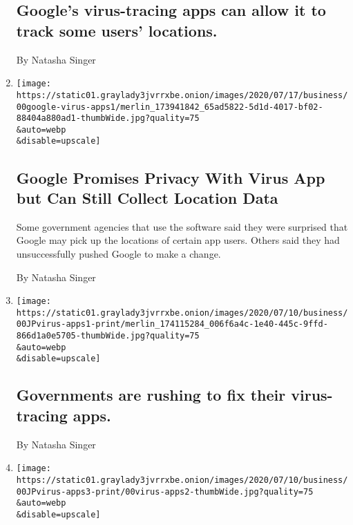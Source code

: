 \begin{enumerate}
{  \subsection{Google's virus-tracing apps can allow it to track some
  users'
  locations.}\label{googles-virus-tracing-apps-can-allow-it-to-track-some-users-locations-1}}

  By Natasha Singer
\item
  \href{/2020/07/20/technology/google-covid-tracker-app.html}{}

  \texttt{[image: https://static01.graylady3jvrrxbe.onion/images/2020/07/17/business/00google-virus-apps1/merlin\_173941842\_65ad5822-5d1d-4017-bf02-88404a880ad1-thumbWide.jpg?quality=75\\\&auto=webp\\\&disable=upscale]}

  \hypertarget{google-promises-privacy-with-virus-app-but-can-still-collect-location-data}{%
  \subsection{Google Promises Privacy With Virus App but Can Still
  Collect Location
  Data}\label{google-promises-privacy-with-virus-app-but-can-still-collect-location-data}}

  Some government agencies that use the software said they were
  surprised that Google may pick up the locations of certain app users.
  Others said they had unsuccessfully pushed Google to make a change.

  By Natasha Singer
\item
  \href{/live/2020/07/08/business/stock-market-today-coronavirus/governments-are-rushing-to-fix-their-virus-tracing-apps}{}

  \texttt{[image: https://static01.graylady3jvrrxbe.onion/images/2020/07/10/business/00JPvirus-apps1-print/merlin\_174115284\_006f6a4c-1e40-445c-9ffd-866d1a0e5705-thumbWide.jpg?quality=75\\\&auto=webp\\\&disable=upscale]}

  \hypertarget{governments-are-rushing-to-fix-their-virus-tracing-apps}{%
  \subsection{Governments are rushing to fix their virus-tracing
  apps.}\label{governments-are-rushing-to-fix-their-virus-tracing-apps}}

  By Natasha Singer
\item
  \href{/2020/07/08/technology/virus-tracing-apps-privacy.html}{}

  \texttt{[image: https://static01.graylady3jvrrxbe.onion/images/2020/07/10/business/00JPvirus-apps3-print/00virus-apps2-thumbWide.jpg?quality=75\\\&auto=webp\\\&disable=upscale]}


\end{enumerate}
